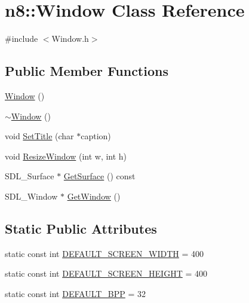 \hypertarget{classn8_1_1_window}{\section{n8\-:\-:Window Class Reference}
\label{classn8_1_1_window}
}


{\ttfamily \#include $<$Window.\-h$>$}

\subsection*{Public Member Functions}
\begin{DoxyCompactItemize}
\item 
\hyperlink{classn8_1_1_window_a23d794805d8de4c98efd5ab685349106}{Window} ()
\item 
\hyperlink{classn8_1_1_window_a0e16f0575d10d2182bc9c572b24559ce}{$\sim$\-Window} ()
\item 
void \hyperlink{classn8_1_1_window_aa603ad1f6e4df1327401df37a0e34529}{Set\-Title} (char $\ast$caption)
\item 
void \hyperlink{classn8_1_1_window_ae4ab3029b3ee1eaabe98947738c486f6}{Resize\-Window} (int w, int h)
\item 
S\-D\-L\-\_\-\-Surface $\ast$ \hyperlink{classn8_1_1_window_a1442cc3a052dea262f04cf2c30d868d5}{Get\-Surface} () const 
\item 
S\-D\-L\-\_\-\-Window $\ast$ \hyperlink{classn8_1_1_window_ae218e0dcdc9081e835cb3a136a7e39e5}{Get\-Window} ()
\end{DoxyCompactItemize}
\subsection*{Static Public Attributes}
\begin{DoxyCompactItemize}
\item 
static const int \hyperlink{classn8_1_1_window_ae426fde4ebf20489d6c7d3e37e520f9d}{D\-E\-F\-A\-U\-L\-T\-\_\-\-S\-C\-R\-E\-E\-N\-\_\-\-W\-I\-D\-T\-H} = 400
\item 
static const int \hyperlink{classn8_1_1_window_ac1aa876c38173e9a4fc6e670529424c2}{D\-E\-F\-A\-U\-L\-T\-\_\-\-S\-C\-R\-E\-E\-N\-\_\-\-H\-E\-I\-G\-H\-T} = 400
\item 
static const int \hyperlink{classn8_1_1_window_a2c179aca7c66204e7f9ec7a0d99efdd0}{D\-E\-F\-A\-U\-L\-T\-\_\-\-B\-P\-P} = 32
\end{DoxyCompactItemize}

